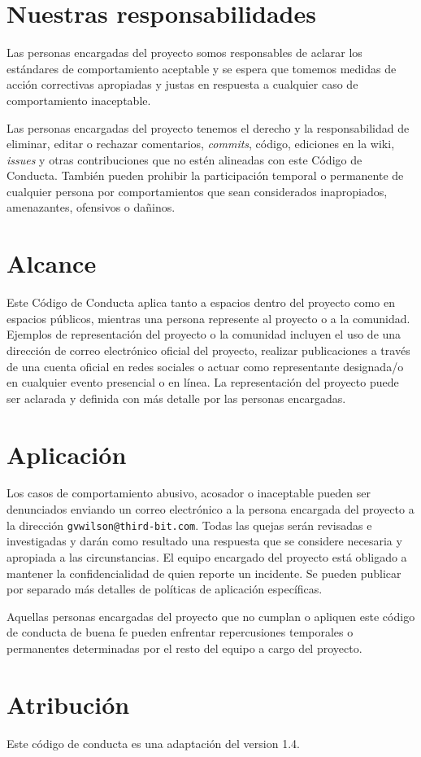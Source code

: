 \section*{Nuestras responsabilidades}

Las personas encargadas del proyecto somos responsables de aclarar los estándares de
comportamiento aceptable y se espera que tomemos medidas de acción correctivas
apropiadas y justas en respuesta a cualquier caso de comportamiento inaceptable.

Las personas encargadas del proyecto tenemos el derecho y la responsabilidad de
eliminar, editar o rechazar comentarios, \emph{commits}, código, ediciones en la wiki, \emph{issues} y otras
contribuciones que no estén alineadas con este Código de Conducta. También pueden
prohibir la participación temporal o permanente de cualquier persona por comportamientos
que sean considerados inapropiados, amenazantes, ofensivos o dañinos.

\section*{Alcance}

Este Código de Conducta aplica tanto a espacios dentro del proyecto
como en espacios públicos, mientras una persona represente al proyecto o a
la comunidad. Ejemplos de representación del proyecto o la comunidad incluyen
el uso de una dirección de correo electrónico oficial del proyecto,
realizar publicaciones a través de una cuenta oficial en redes sociales
o actuar como representante designada/o en cualquier evento presencial o en línea.
La representación del proyecto puede ser aclarada y definida con más
detalle por las personas encargadas.

\section*{Aplicación}

Los casos de comportamiento abusivo, acosador o inaceptable
pueden ser denunciados enviando un correo electrónico a la persona encargada del proyecto a la dirección \texttt{gvwilson@third-bit.com}.
Todas las quejas serán revisadas e investigadas y darán como resultado
una respuesta que se considere necesaria y apropiada a las circunstancias.
El equipo encargado del proyecto está obligado a mantener la confidencialidad de quien reporte un incidente.
Se pueden publicar por separado más detalles
de políticas de aplicación específicas.

Aquellas personas encargadas del proyecto que no cumplan o apliquen 
este código de conducta de buena fe pueden enfrentar repercusiones
temporales o permanentes determinadas por el resto del equipo a cargo
del proyecto.

\section*{Atribución}

Este código de conducta es una adaptación del
 version 1.4.
